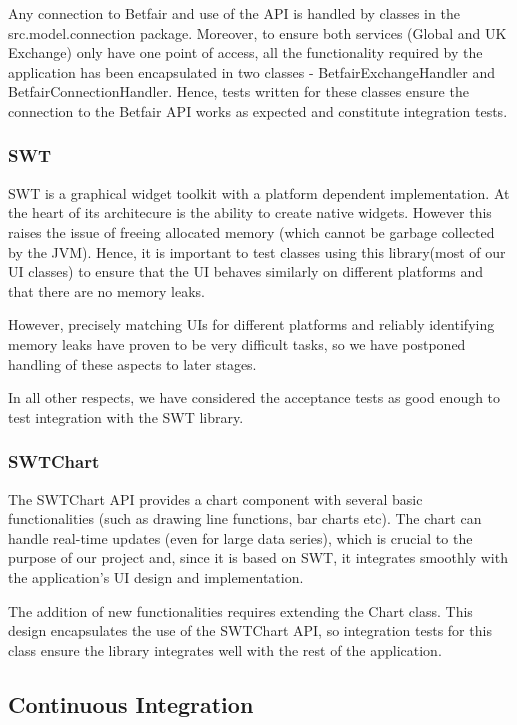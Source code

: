 \documentclass[10pt]{report}
\begin{document}
Any connection to Betfair and use of the API is handled by classes in the src.model.connection package. Moreover, to ensure both services (Global and UK Exchange) only have one point of access, all the functionality required by the application has been encapsulated in two classes - BetfairExchangeHandler and BetfairConnectionHandler. Hence, tests written for these classes ensure the connection to the Betfair API works as expected and constitute integration tests.

\subsubsection{SWT}

SWT is a graphical widget toolkit with a platform dependent implementation. At the heart of its architecure is the ability to create native widgets. However this raises the issue of freeing allocated memory (which cannot be garbage collected by the JVM).
Hence, it is important to test classes using this library(most of our UI classes) to ensure that the UI behaves similarly on different platforms and that there are no memory leaks.

However, precisely matching UIs for different platforms and reliably identifying memory leaks have proven to be very difficult tasks, so we have postponed handling of these aspects to later stages.

In all other respects, we have considered the acceptance tests as good enough to test integration with the SWT library.

\subsubsection{SWTChart}

The SWTChart API provides a chart component with several basic functionalities (such as drawing line functions, bar charts etc). The chart can handle real-time updates (even for large data series), which is crucial to the purpose of our project and, since it is based on SWT, it integrates smoothly with the application's UI design and implementation. 

The addition of new functionalities requires extending the Chart class. This design encapsulates the use of the SWTChart API, so integration tests for this class ensure the library integrates well with the rest of the application. 

\subsection{Continuous Integration}
\end{document}
